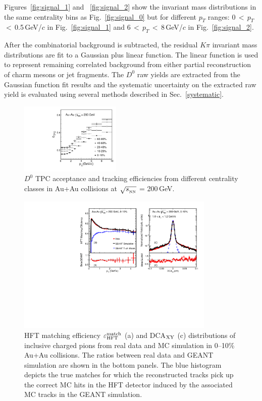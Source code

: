 \documentclass[%
 reprint,	
showpacs,
 amsmath,amssymb,
 aps,
 prc,
]{revtex4-1}
\begin{document}
Figures~\ref{fig:signal_1} and ~\ref{fig:signal_2} show the invariant mass distributions in the same centrality bins as Fig.~\ref{fig:signal_0} but for different $p_T$ ranges: 0\,$<$\,$p_{T}$\,$<$\,0.5\,GeV/$c$ in Fig.~\ref{fig:signal_1} and 6\,$<$\,$p_{T}$\,$<$\,8\,GeV/$c$ in Fig.~\ref{fig:signal_2}.

After the combinatorial background is subtracted, the residual $K\pi$ invariant mass distributions are fit to a Gaussian plus linear function. The linear function is used to represent remaining correlated background from either partial reconstruction of charm mesons or jet fragments.
The $D^0$ raw yields are extracted from the Gaussian function fit results and the systematic uncertainty on the extracted raw yield is evaluated using several methods described in Sec.~\ref{systematic}.

\begin{figure}
\centering
\includegraphics[width=0.43\textwidth]{fig/Datad0Eff_tpc_10.pdf}
  \caption{$D^{0}$ TPC acceptance and tracking efficiencies from different centrality classes in Au+Au collisions at $\sqrt{s_{_{\rm NN}}}$ = 200\,GeV.}
\label{fig:Datad0Eff_tpc} 
\end{figure}

\begin{figure}
\centering
\includegraphics[width=0.84\textwidth]{fig/HijingRatioDca.pdf}
\caption{HFT matching efficiency $\varepsilon_{\rm HFT}^{\rm match}$ (a) and DCA$_{\rm XY}$ (c) distributions of inclusive charged pions from real data and MC simulation in 0--10\% Au+Au collisions. The ratios between real data and GEANT simulation are shown in the bottom panels. The blue histogram depicts the true matches for which the reconstructed tracks pick up the correct MC hits in the HFT detector induced by the associated MC tracks in the GEANT simulation.}
\label{fig:HijingRatioDca} 
\end{figure}
\end{document}
